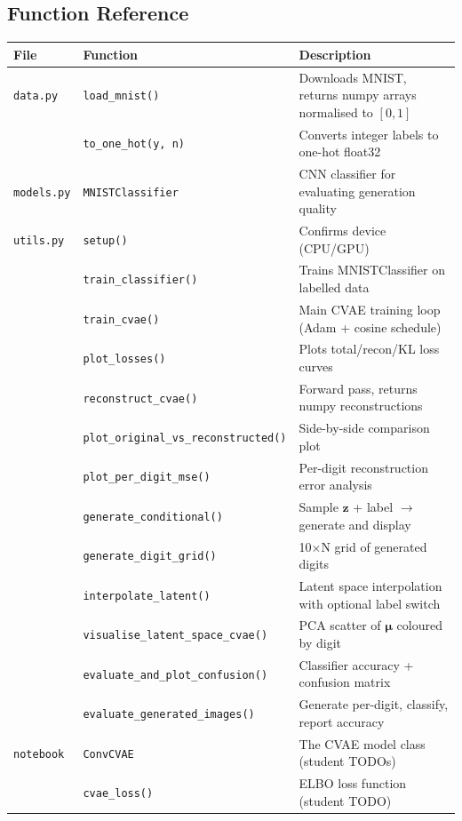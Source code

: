 \documentclass[11pt,a4paper]{article}
\begin{document}
\subsection{Function Reference}

\begin{center}
\small
\begin{tabular}{llp{7cm}}
\toprule
\textbf{File} & \textbf{Function} & \textbf{Description} \\
\midrule
\texttt{data.py} & \texttt{load\_mnist()} & Downloads MNIST, returns numpy arrays normalised to $[0,1]$ \\
& \texttt{to\_one\_hot(y, n)} & Converts integer labels to one-hot float32 \\
\midrule
\texttt{models.py} & \texttt{MNISTClassifier} & CNN classifier for evaluating generation quality \\
\midrule
\texttt{utils.py} & \texttt{setup()} & Confirms device (CPU/GPU) \\
& \texttt{train\_classifier()} & Trains MNISTClassifier on labelled data \\
& \texttt{train\_cvae()} & Main CVAE training loop (Adam + cosine schedule) \\
& \texttt{plot\_losses()} & Plots total/recon/KL loss curves \\
& \texttt{reconstruct\_cvae()} & Forward pass, returns numpy reconstructions \\
& \texttt{plot\_original\_vs\_reconstructed()} & Side-by-side comparison plot \\
& \texttt{plot\_per\_digit\_mse()} & Per-digit reconstruction error analysis \\
& \texttt{generate\_conditional()} & Sample $\mathbf{z}$ + label $\to$ generate and display \\
& \texttt{generate\_digit\_grid()} & 10$\times$N grid of generated digits \\
& \texttt{interpolate\_latent()} & Latent space interpolation with optional label switch \\
& \texttt{visualise\_latent\_space\_cvae()} & PCA scatter of $\boldsymbol{\mu}$ coloured by digit \\
& \texttt{evaluate\_and\_plot\_confusion()} & Classifier accuracy + confusion matrix \\
& \texttt{evaluate\_generated\_images()} & Generate per-digit, classify, report accuracy \\
\midrule
\texttt{notebook} & \texttt{ConvCVAE} & The CVAE model class (student TODOs) \\
& \texttt{cvae\_loss()} & ELBO loss function (student TODO) \\
\bottomrule
\end{tabular}
\end{center}
\end{document}
